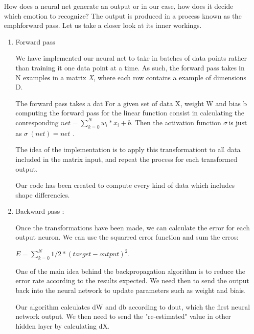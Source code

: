 How does a neural net generate an output or in our case, how does it decide which emotion to recognize?
The output is produced in a process known as the emph{forward pass}.
Let us take a closer look at its inner workings.

\begin{enumerate}
\item Forward pass

We have implemented our neural net to take in batches of data points rather than training it one data point at a time.
As such, the forward pass takes in N examples in a matrix \emph{X}, where each row contains a example of dimensions D.

The forward pass takes a dat
For a given set of data X, weight W and bias b computing the forward pass for the linear function consist in calculating the conresponding  $net = \sum_{k=0}^{N} w_i * x_i + b $.
Then the activation function $\sigma\ $is just as $\sigma\ (net) = net$ .

The idea of the implementation is to apply this transformationt to all data included in the matrix input, and repeat the process for each transformed output. 

Our code has been created to compute every kind of data which includes shape differencies.



\item Backward pass :

Once the transformations have been made, we can calculate the error for each output neuron. We can use the squarred error function and sum the erros:

$E = \sum_{k=0}^{N} 1/2*(target - output)^2$.

One of the main idea behind the backpropagation algorithm is to reduce the error rate according to the results expected. We need then to send the output back into the neural network to update parameters such as weight and biais. 

Our algorithm calculates dW and db according to dout, which the first neural network output.
We then need to send the "re-estimated" value in other hidden layer by calculating dX.

\end{enumerate}

